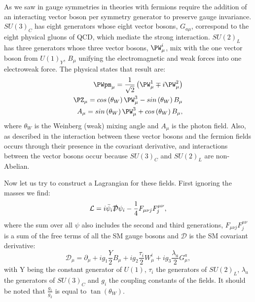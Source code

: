 As we saw in  gauge symmetries in theories with fermions require the addition of an interacting vector boson per symmetry generator to preserve gauge invariance. $SU\left(3\right)_{C}$ has eight generators whose eight vector bosons, $G_{a\mu}$, correspond to the eight physical gluons of \ac{QCD}, which mediate the strong interaction. $SU\left(2\right)_{L}$ has three generators whose three vector bosons, $\PW^{i}_{\mu}$, mix with the one vector boson from $U\left(1\right)_{Y}$, $B_{\mu}$ unifying the electromagnetic and weak forces into one electroweak force. The physical states that result are:
\begin{equation}
  \begin{split}
  \PWpm_{\mu}=\frac{1}{\sqrt{2}}\left(\PW^{1}_{\mu}\mp i\PW^{2}_{\mu}\right) \\
  \PZ_{\mu}=cos\left(\theta_{W}\right)\PW^{3}_{\mu}-sin\left(\theta_{W}\right)B_{\mu} \\
  A_{\mu}=sin\left(\theta_{W}\right)\PW^{3}_{\mu}+cos\left(\theta_{W}\right)B_{\mu},
  \end{split}
\end{equation}
where $\theta_{W}$ is the Weinberg (weak) mixing angle and $A_{\mu}$ is the photon field. Also, as described in  the interaction between these vector bosons and the fermion fields occurs through their presence in the covariant derivative, and interactions between the vector bosons occur because $SU\left(3\right)_{C}$ and $SU\left(2\right)_{L}$ are non-Abelian.

Now let us try to construct a Lagrangian for these fields. First ignoring the masses we find:
\begin{equation}
  \mathcal{L}=i\bar{\psi}_{i}\slashed{\mathcal{D}}\psi_{i}-\frac{1}{4}F_{\mu\nu j}F^{\mu\nu}_{j},
\end{equation}
where the sum over all $\psi$ also includes the second and third generations, $F_{\mu\nu j}F^{\mu\nu}_{j}$ is a sum of the free terms of all the SM gauge bosons and $\mathcal{D}$ is the SM covariant derivative:
\begin{equation}
  \mathcal{D_{\mu}}=\partial_{\mu}+ig_{1}\frac{Y}{2}B_{\mu}+ig_{2}\frac{\tau_{i}}{2}W_{\mu}^{i}+ig_{3}\frac{\lambda_{a}}{2}G_{\mu}^{a},
\end{equation}
with Y being the constant generator of $U\left(1\right)$, $\tau_{i}$ the generators of $SU\left(2\right)_{L}$, $\lambda_{a}$ the generators of $SU\left(3\right)_{C}$ and $g_{i}$ the coupling constants of the fields. It should be noted that $\frac{g_{1}}{g_{2}}$ is equal to $\tan\left(\theta_{W}\right)$.

